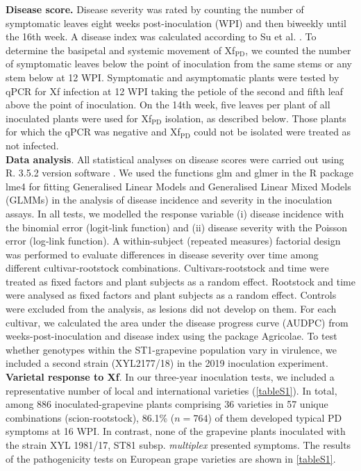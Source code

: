 \noindent\textbf{Disease score.} Disease severity was rated by counting the
number of symptomatic leaves eight weeks post-inoculation (WPI) and then
biweekly until the 16th week. A disease index was calculated according to Su et
al. \cite{Su2013}. To determine the basipetal and systemic movement of
Xf$_{\textrm{PD}}$, we counted the number of symptomatic leaves below the point
of inoculation from the same stems or any stem below at 12 WPI. Symptomatic and
asymptomatic plants were tested by qPCR for Xf infection at 12 WPI taking the
petiole of the second and fifth leaf above the point of inoculation. On the
14th week, five leaves per plant of all inoculated plants were used for
Xf$_{\textrm{PD}}$ isolation, as described below. Those plants for which the
qPCR was negative and Xf$_{\textrm{PD}}$ could not be isolated were treated as
not infected.\\

\noindent\textbf{Data analysis}. All statistical analyses on disease scores
were carried out using R. 3.5.2 version software
\cite{R-Development-Core-Team2017}. We used the functions glm and glmer in the
R package lme4 \cite{Bates2015}  for fitting Generalised Linear Models and
Generalised Linear Mixed Models (GLMMs) in the analysis of disease incidence
and severity in the inoculation assays. In all tests, we modelled the response
variable (i) disease incidence with the binomial error (logit‐link function)
and (ii) disease severity with the Poisson error (log‐link function). A
within-subject (repeated measures) factorial design was performed to evaluate
differences in disease severity over time among different cultivar-rootstock
combinations. Cultivars-rootstock and time were treated as fixed factors and
plant subjects as a random effect. Rootstock and time were analysed as fixed
factors and plant subjects as a random effect. Controls were excluded from the
analysis, as lesions did not develop on them. For each cultivar, we calculated
the area under the disease progress curve (AUDPC) from weeks-post-inoculation
and disease index using the package Agricolae. To test whether genotypes within
the ST1-grapevine population vary in virulence, we included a second strain
(XYL2177/18) in the 2019 inoculation experiment. \\

\noindent\textbf{Varietal response to Xf}. In our three-year inoculation tests,
we included a representative number of local and international varieties
(\cref{tableS1}). In total, among 886 inoculated-grapevine plants comprising 36
varieties in 57 unique combinations (scion-rootstock), 86.1\% ($n = 764$) of
them developed typical PD symptoms at 16 WPI. In contrast, none of the
grapevine plants inoculated with the strain XYL 1981/17, ST81 subsp.
\textit{multiplex} presented symptoms. The results of the pathogenicity tests
on European grape varieties are shown in \cref{tableS1}.

